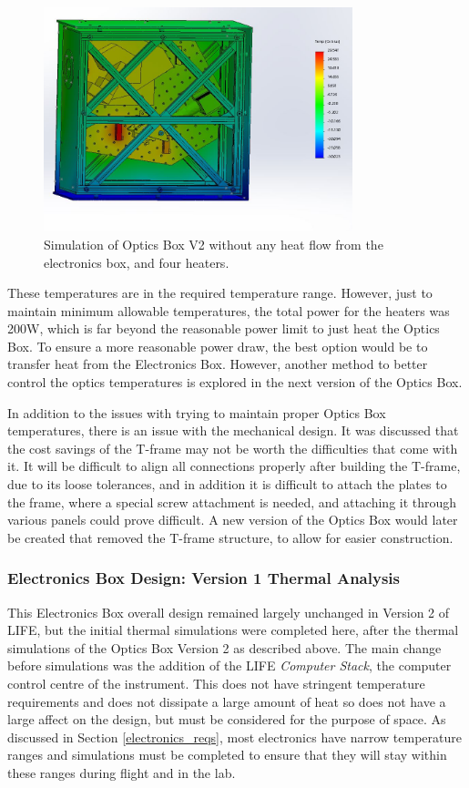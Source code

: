 \begin{figure}
    \centering
    \includegraphics[width=0.8\textwidth]{chap3_images/LIFE_V2_images/TA_-30_no_front_wall_four_heaters.JPG}
    \caption{Simulation of Optics Box V2 without any heat flow from the electronics box, and four heaters.}
    \label{fig:OB_V2_TA_4_4HEATERS}
\end{figure}

These temperatures are in the required temperature range. However, just to maintain minimum allowable temperatures, the total power for the heaters was 200W, which is far beyond the reasonable power limit to just heat the Optics Box. To ensure a more reasonable power draw, the best option would be to transfer heat from the Electronics Box. However, another method to better control the optics temperatures is explored in the next version of the Optics Box.

In addition to the issues with trying to maintain proper Optics Box temperatures, there is an issue with the mechanical design. It was discussed that the cost savings of the T-frame may not be worth the difficulties that come with it. It will be difficult to align all connections properly after building the T-frame, due to its loose tolerances, and in addition it is difficult to attach the plates to the frame, where a special screw attachment is needed, and attaching it through various panels could prove difficult. A new version of the Optics Box would later be created that removed the T-frame structure, to allow for easier construction.

\subsubsection{Electronics Box Design: Version 1 Thermal Analysis}
This Electronics Box overall design remained largely unchanged in Version 2 of LIFE, but the initial thermal simulations were completed here, after the thermal simulations of the Optics Box Version 2 as described above. The main change before simulations was the addition of the LIFE \textit{Computer Stack}, the computer control centre of the instrument. This does not have stringent temperature requirements and does not dissipate a large amount of heat so does not have a large affect on the design, but must be considered for the purpose of space. As discussed in Section \ref{electronics_reqs}, most electronics have narrow temperature ranges and simulations must be completed to ensure that they will stay within these ranges during flight and in the lab.

